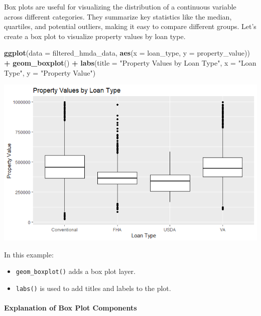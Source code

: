 \documentclass[
]{book}
\newenvironment{Shaded}{\begin{snugshade}}{\end{snugshade}}
\newcommand{\AttributeTok}[1]{\textcolor[rgb]{0.13,0.29,0.53}{#1}}
\newcommand{\FunctionTok}[1]{\textcolor[rgb]{0.13,0.29,0.53}{\textbf{#1}}}
\newcommand{\NormalTok}[1]{#1}
\newcommand{\SpecialCharTok}[1]{\textcolor[rgb]{0.81,0.36,0.00}{\textbf{#1}}}
\newcommand{\StringTok}[1]{\textcolor[rgb]{0.31,0.60,0.02}{#1}}
\begin{document}
Box plots are useful for visualizing the distribution of a continuous variable across different categories. They summarize key statistics like the median, quartiles, and potential outliers, making it easy to compare different groups. Let's create a box plot to visualize property values by loan type.

\begin{Shaded}
\begin{Highlighting}[]
\FunctionTok{ggplot}\NormalTok{(}\AttributeTok{data =}\NormalTok{ filtered\_hmda\_data, }\FunctionTok{aes}\NormalTok{(}\AttributeTok{x =}\NormalTok{ loan\_type, }\AttributeTok{y =}\NormalTok{ property\_value)) }\SpecialCharTok{+}
  \FunctionTok{geom\_boxplot}\NormalTok{() }\SpecialCharTok{+}
  \FunctionTok{labs}\NormalTok{(}\AttributeTok{title =} \StringTok{"Property Values by Loan Type"}\NormalTok{,}
       \AttributeTok{x =} \StringTok{"Loan Type"}\NormalTok{,}
       \AttributeTok{y =} \StringTok{"Property Value"}\NormalTok{)}
\end{Highlighting}
\end{Shaded}

\includegraphics{images/box_plot.PNG}

In this example:

\begin{itemize}
\item
  \texttt{geom\_boxplot()} adds a box plot layer.
\item
  \texttt{labs()} is used to add titles and labels to the plot.
\end{itemize}

\hypertarget{explanation-of-box-plot-components}{%
\paragraph*{Explanation of Box Plot Components}\label{explanation-of-box-plot-components}}
\end{document}

